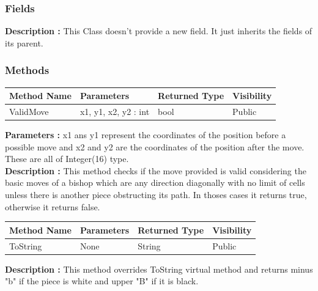 \documentclass[12pt]{article}
\begin{document}
\subsubsection{Fields}

\textbf{Description :} This Class doesn't provide a new field. It just
inherits the fields of its parent.

\subsubsection{Methods}

\begin{table}[H]
    \begin{tabular}{|l|l|l|l|}
    \hline
    \rowcolor[HTML]{EFEFEF} 
    \cellcolor[HTML]{EFEFEF}\textbf{Method Name} & \textbf{Parameters}  & \textbf{Returned Type} & \textbf{Visibility} \\ \hline
    ValidMove                          & x1, y1, x2, y2 : int & bool                   & Public              \\ \hline
    \end{tabular}
\end{table}

\textbf{Parameters :} x1 ans y1 represent the coordinates of the position before a possible move
and x2 and y2 are the coordinates of the position after the move. These are all of Integer(16) type.
\\
\textbf{Description :} This method checks if the move provided is valid considering the basic moves of a bishop which
are any direction diagonally with no limit of cells unless there is another piece obstructing its path. In thoses 
cases it returns true, otherwise it returns false. 

\begin{table}[H]
    \begin{tabular}{|l|l|l|l|}
    \hline
    \rowcolor[HTML]{EFEFEF} 
    \cellcolor[HTML]{EFEFEF}\textbf{Method Name} & \textbf{Parameters}  & \textbf{Returned Type} & \textbf{Visibility} \\ \hline
    ToString                                   & None                 & String                   & Public              \\ \hline
    \end{tabular}
\end{table}

\textbf{Description :} This method overrides ToString virtual
method and returns minus "b" if the piece is white and upper "B"
if it is black.
\end{document}
